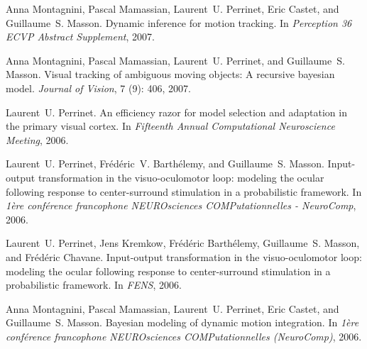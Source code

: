 \documentclass[11pt,french,a4paper,oneside]{article}%
\begin{document}
\begin{etaremune}
\item %
Anna Montagnini, Pascal Mamassian, Laurent~U. Perrinet, Eric Castet, and
  Guillaume~S. Masson.
\newblock Dynamic inference for motion tracking.
\newblock In \emph{Perception 36 ECVP Abstract Supplement}, 2007.

\item %
Anna Montagnini, Pascal Mamassian, Laurent~U. Perrinet, and Guillaume~S.  Masson.
\newblock Visual tracking of ambiguous moving objects: A recursive bayesian model.
\newblock \emph{Journal of Vision}, 7 (9): 406,
  2007.


\item %
Laurent~U. Perrinet.
\newblock An efficiency razor for model selection and adaptation in the primary
  visual cortex.
\newblock In \emph{Fifteenth Annual Computational Neuroscience Meeting}, 2006.


\item %
Laurent~U. Perrinet, Fr{\'e}d{\'e}ric~V. Barth{\'e}lemy, and Guillaume~S.
  Masson.
\newblock Input-output transformation in the visuo-oculomotor loop: modeling
  the ocular following response to center-surround stimulation in a
  probabilistic framework.
\newblock In \emph{1{\`e}re conf{\'e}rence francophone NEUROsciences
  COMPutationnelles - NeuroComp}, 2006.

\item %
Laurent~U. Perrinet, Jens Kremkow, Fr{\'e}d{\'e}ric Barth{\'e}lemy,
  Guillaume~S. Masson, and Fr{\'e}d{\'e}ric Chavane.
\newblock Input-output transformation in the visuo-oculomotor loop: modeling
  the ocular following response to center-surround stimulation in a
  probabilistic framework.
\newblock In \emph{{FENS}}, 2006.

\item %
Anna Montagnini, Pascal Mamassian, Laurent~U. Perrinet, Eric Castet, and
  Guillaume~S. Masson.
\newblock Bayesian modeling of dynamic motion integration.
\newblock In \emph{1{\`e}re conf{\'e}rence francophone NEUROsciences
  COMPutationnelles (NeuroComp)}, 2006.


\end{etaremune}
\end{document}
